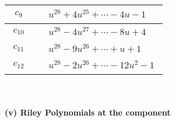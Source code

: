 \documentclass[1p]{elsarticle_modified}
\theoremstyle{definition}
\begin{document}
\begin{tabular}{m{50pt}|m{274pt}}
\hline $$\begin{aligned}c_{9}\end{aligned}$$&$\begin{aligned}
&u^{28}+4 u^{25}+\cdots-4 u-1
\end{aligned}$\\
\hline $$\begin{aligned}c_{10}\end{aligned}$$&$\begin{aligned}
&u^{28}-4 u^{27}+\cdots-8 u+4
\end{aligned}$\\
\hline $$\begin{aligned}c_{11}\end{aligned}$$&$\begin{aligned}
&u^{28}-9 u^{26}+\cdots+u+1
\end{aligned}$\\
\hline $$\begin{aligned}c_{12}\end{aligned}$$&$\begin{aligned}
&u^{28}-2 u^{26}+\cdots-12 u^2-1
\end{aligned}$\\
\hline
\end{tabular}\\~\\
\newpage\renewcommand{\arraystretch}{1}
\flushleft \textbf{(v) Riley Polynomials at the component}\newline \\
\end{document}
